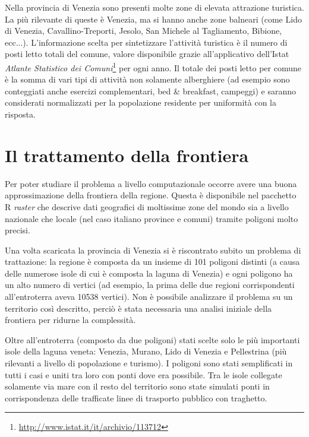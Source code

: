 \documentclass[a4paper,11pt,twoside,openright]{book}							%
\begin{document}
Nella provincia di Venezia sono presenti molte zone di elevata attrazione turistica. La più rilevante di queste è Venezia, ma si hanno anche zone balneari (come Lido di Venezia, Cavallino-Treporti, Jesolo, San Michele al Tagliamento, Bibione, ecc...). L'informazione scelta per sintetizzare l'attività turistica è il numero di posti letto totali del comune, valore disponibile grazie all'applicativo dell'Istat \textit{Atlante Statistico dei Comuni}\footnote{\href{http://www.istat.it/it/archivio/113712}{http://www.istat.it/it/archivio/113712}} per ogni anno. Il totale dei posti letto per comune è la somma di vari tipi di attività non solamente alberghiere (ad esempio sono conteggiati anche esercizi complementari, bed \& breakfast, campeggi) e saranno considerati normalizzati per la popolazione residente per uniformità con la risposta.


\section{Il trattamento della frontiera}

Per poter studiare il problema a livello computazionale occorre avere una buona approssimazione della frontiera della regione. Questa è disponibile nel pacchetto R \textit{raster} che descrive dati geografici di moltissime zone del mondo sia a livello nazionale che locale (nel caso italiano province e comuni) tramite poligoni molto precisi.

Una volta scaricata la provincia di Venezia si è riscontrato subito un problema di trattazione: la regione è composta da un insieme di 101 poligoni distinti (a causa delle numerose isole di cui è composta la laguna di Venezia) e ogni poligono ha un alto numero di vertici (ad esempio, la prima delle due regioni corrispondenti all'entroterra aveva 10538 vertici). Non è possibile analizzare il problema su un territorio così descritto, perciò è stata necessaria una analisi iniziale della frontiera per ridurne la complessità.

Oltre all'entroterra (composto da due poligoni) stati scelte solo le più importanti isole della laguna veneta: Venezia, Murano, Lido di Venezia e Pellestrina (più rilevanti a livello di popolazione e turismo). I poligoni sono stati semplificati in tutti i casi e uniti tra loro con ponti dove era possibile. Tra le isole collegate solamente via mare con il resto del territorio sono state simulati ponti in corrispondenza delle trafficate linee di trasporto pubblico con traghetto.
\end{document}
